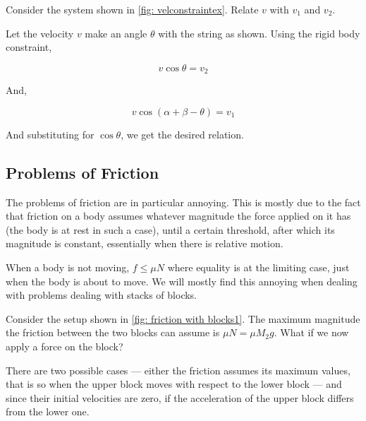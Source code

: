 \begin{example}
    Consider the system shown in \cref{fig: velconstraintex}. Relate \(v\) with
    \(v_1\) and \(v_2\).

\begin{soln}
        Let the velocity \(v\) make an angle \(\theta\) with the string as shown.
        Using the rigid body constraint,

        \begin{equation*}
            v\cos\theta = v_2
        \end{equation*}

        And,

        \begin{equation*}
            v\cos(\alpha+\beta-\theta) = v_1
        \end{equation*}

        And substituting for \(\cos\theta\), we get the desired relation.
    \end{soln}
\end{example}

\begin{marginfigure}
    \vspace{2em}
\end{marginfigure}

\subsection{Problems of Friction}

The problems of friction are in particular annoying. This is mostly due to 
the fact that friction on a body assumes whatever magnitude the force applied
on it has (the body is at rest in such a case), until a certain threshold, after which its magnitude is constant, essentially 
when there is relative motion.

When a body is not moving, \(f \le \mu N\) where equality is at the limiting case, 
just when the body is about to move. We will mostly find this annoying when dealing with 
problems dealing with stacks of blocks.


Consider the setup shown in \cref{fig: friction with blocks1}. The maximum magnitude the 
friction between the two blocks can assume is \(\mu N = \mu M_2g\). What if we now apply 
a force on the block? 

There are two possible cases --- either the friction assumes its maximum values, that is so when
the upper block moves with respect to the lower block --- and since their initial velocities
are zero, if the acceleration of the upper block differs from the lower one.

